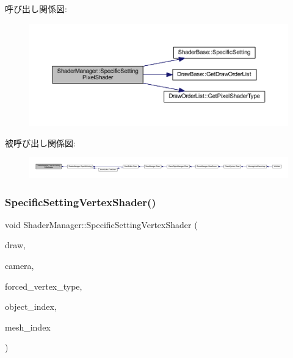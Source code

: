 呼び出し関係図\+:
\nopagebreak
\begin{figure}[H]
\begin{center}
\leavevmode
\includegraphics[width=350pt]{class_shader_manager_a1158156785098fe426dd514e4c2a97c1_cgraph}
\end{center}
\end{figure}
被呼び出し関係図\+:
\nopagebreak
\begin{figure}[H]
\begin{center}
\leavevmode
\includegraphics[width=350pt]{class_shader_manager_a1158156785098fe426dd514e4c2a97c1_icgraph}
\end{center}
\end{figure}
\mbox{\label{class_shader_manager_a2433c0715142fd310a497e080f7d0ddb}} 
\subsubsection{\texorpdfstring{Specific\+Setting\+Vertex\+Shader()}{SpecificSettingVertexShader()}}
{\footnotesize\ttfamily void Shader\+Manager\+::\+Specific\+Setting\+Vertex\+Shader (\begin{DoxyParamCaption}\item[{\mbox{\hyperlink{class_draw_base}{Draw\+Base}} $\ast$}]{draw,  }\item[{\mbox{\hyperlink{class_camera}{Camera}} $\ast$}]{camera,  }\item[{\mbox{\hyperlink{class_shader_manager_a9b51e49d70eb3cc58f6d1f3994e8cfbd}{Vertex\+Shader\+Type}}}]{forced\+\_\+vertex\+\_\+type,  }\item[{unsigned}]{object\+\_\+index,  }\item[{unsigned}]{mesh\+\_\+index }\end{DoxyParamCaption})\hspace{0.3cm}{\ttfamily [private]}}



